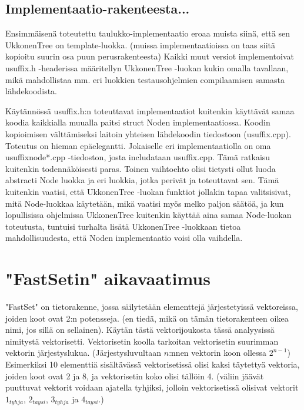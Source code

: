 \documentclass{article}
\begin{document}
    \subsection{Implementaatio-rakenteesta...}
        Ensimmäisenä toteutettu taulukko-implementaatio eroaa muista siinä, että sen UkkonenTree on template-luokka. (muissa
        implementaatioissa on taas siitä kopioitu suurin osa puun perusrakenteesta) Kaikki muut versiot implementoivat
        usuffix.h -headerissa määritellyn UkkonenTree -luokan kukin omalla tavallaan, mikä mahdollistaa mm. eri luokkien 
        testausohjelmien compilaamisen samasta lähdekoodista.
        
        Käytännössä usuffix.h:n toteuttavat implementaatiot kuitenkin käyttävät samaa koodia kaikkialla muualla paitsi
        struct Noden implementaatiossa. Koodin kopioimisen välttämiseksi laitoin yhteisen lähdekoodin tiedostoon (usuffix.cpp).
        Toteutus on hieman epäelegantti. Jokaiselle eri implementaatiolla on oma usuffixnode*.cpp -tiedoston, josta 
        includataan usuffix.cpp. Tämä ratkaisu kuitenkin todennäköisesti paras. Toinen vaihtoehto olisi tietysti ollut
        luoda abstracti Node luokka ja eri luokkia, jotka perivät ja toteuttavat sen. Tämä kuitenkin vaatisi, että
        UkkonenTree -luokan funktiot jollakin tapaa valitsisivat, mitä Node-luokkaa käytetään, mikä vaatisi myös melko
        paljon säätöä, ja kun lopullisissa ohjelmissa UkkonenTree kuitenkin käyttää aina samaa Node-luokan toteutusta,
        tuntuisi turhalta lisätä UkkonenTree -luokkaan tietoa mahdollisuudesta, että Noden implementaatio voisi olla 
        vaihdella.
        
  \newpage
  \section{"FastSetin" aikavaatimus}

    "FastSet" on tietorakenne, jossa säilytetään elementtejä järjestetyissä vektoreissa, joiden koot ovat 2:n potensseja.  
    (en tiedä, mikä on tämän tietorakenteen oikea nimi, jos sillä on sellainen). Käytän tästä vektorijoukosta tässä 
    analyysissä nimitystä vektorisetti. Vektorisetin koolla tarkoitan vektorisetin suurimman vektorin järjestyslukua.
    (Järjestysluvultaan $n$:nnen vektorin koon ollessa $2^{n-1}$) Esimerkiksi 10 elementtiä sisältävässä vektorisetissä olisi 
    kaksi täytettyä vektoria, joiden koot ovat 2 ja 8, ja vektorisetin koko olisi tällöin 4. (väliin jäävät puuttuvat vektorit 
    voidaan ajatella tyhjiksi, jolloin vektorisetissä olisivat vektorit $1_{tyhja}$, $2_{taysi}$, $3_{tyhja}$ ja $4_{taysi}$.)
    
\end{document}
